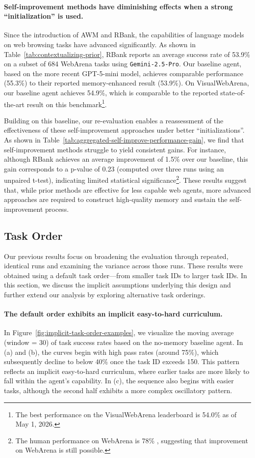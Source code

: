 \documentclass{article}
\begin{document}
\paragraph{Self-improvement methods have diminishing effects when a strong ``initialization'' is used.}
Since the introduction of AWM and RBank, the capabilities of language models on web browsing tasks have advanced significantly. As shown in Table~\ref{tab:contextualizing-prior}, RBank reports an average success rate of 53.9\% on a subset of 684 WebArena tasks using \texttt{Gemini-2.5-Pro}. Our baseline agent, based on the more recent GPT-5-mini model, achieves comparable performance (55.3\%) to their reported memory-enhanced result (53.9\%). On VisualWebArena, our baseline agent achieves 54.9\%, which is comparable to the reported state-of-the-art result on this benchmark\footnote{The best performance on the VisualWebArena leaderboard is 54.0\% as of May 1, 2026.}.

Building on this baseline, our re-evaluation enables a reassessment of the effectiveness of these self-improvement approaches under better ``initializations''. 
As shown in Table~\ref{tab:aggregated-self-improve-performance-gain}, we find that self-improvement methods struggle to yield consistent gains.
For instance, although RBank achieves an average improvement of 1.5\% over our baseline, this gain corresponds to a p-value of 0.23 (computed over three runs using an unpaired t-test), indicating limited statistical significance\footnote{The human performance on WebArena is 78\% \cite{zhou2024webarena}, suggesting that improvement on WebArena is still possible.}.
These results suggest that, while prior methods are effective for less capable web agents, more advanced approaches are required to construct high-quality memory and sustain the self-improvement process.

\subsection{Task Order}
Our previous results focus on broadening the evaluation through repeated, identical runs and examining the variance across those runs. These results were obtained using a default task order—from smaller task IDs to larger task IDs. In this section, we discuss the implicit assumptions underlying this design and further extend our analysis by exploring alternative task orderings.

\paragraph{The default order exhibits an implicit easy-to-hard curriculum.}
In Figure~\ref{fig:implicit-task-order-examples}, we visualize the moving average (window = 30) of task success rates based on the no-memory baseline agent. In (a) and (b), the curves begin with high pass rates (around 75\%), which subsequently decline to below 40\% once the task ID exceeds 150. This pattern reflects an implicit easy-to-hard curriculum, where earlier tasks are more likely to fall within the agent’s capability. In (c), the sequence also begins with easier tasks, although the second half exhibits a more complex oscillatory pattern.
\end{document}
